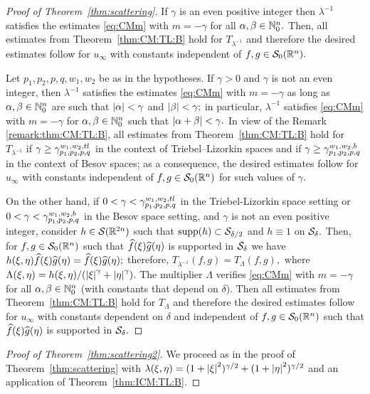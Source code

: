 \begin{proof}[Proof of Theorem~\ref{thm:scattering}]
If $\gamma$ is an even positive integer then $\lambda^{-1}$ satisfies the estimates \eqref{eq:CMm} with $m=-\gamma$ for all $\alpha,\beta\in\mathbb{N}_0^n.$ Then,  all estimates from Theorem~\ref{thm:CM:TL:B} hold for $T_{\lambda^{-1}}$  and therefore the desired estimates follow for $u_\infty$ with constants independent of $f,g\in{\mathcal{S}_0}({{\mathbb R}^n}).$ 

Let $p_1,p_2,p,q, w_1,w_2$ be as in the hypotheses.  If $\gamma>0$ and $\gamma$ is not an even integer, then $\lambda^{-1}$ satisfies the estimates \eqref{eq:CMm} with $m=-\gamma$ as long as  $\alpha,\beta\in\mathbb{N}_0^n$ are such that $\left\vert \alpha \right\vert<\gamma$ and $\left\vert \beta \right\vert<\gamma;$ in particular, $\lambda^{-1}$ satisfies \eqref{eq:CMm} with $m=-\gamma$ for $\alpha,\beta\in \mathbb{N}_0^n$ such that $\left\vert \alpha+\beta \right\vert<\gamma.$
In view of the Remark \ref{remark:thm:CM:TL:B}, all estimates from Theorem~\ref{thm:CM:TL:B} hold for $T_{\lambda^{-1}}$ if $\gamma\ge \gamma_{p_1,p_2,p,q}^{w_1,w_2, tl}$ in the context of Triebel--Lizorkin spaces and if $\gamma\ge \gamma_{p_1,p_2,p,q}^{w_1,w_2,b}$ in the context of Besov spaces; as a consequence, the desired estimates follow for $u_\infty$ with constants independent of $f,g\in{\mathcal{S}_0}({{\mathbb R}^n})$ for such values of $\gamma.$


On the other hand, if $0<\gamma<\gamma_{p_1,p_2,p,q}^{w_1,w_2, tl}$ in the Triebel-Lizorkin space setting or $0<\gamma<\gamma_{p_1,p_2,p,q}^{w_1,w_2,b}$ in the Besov space setting, and $\gamma$ is not an even positive integer, consider  $h\in\mathcal{S}(\mathbb{R}^{2n}) $ such that ${\rm{supp}}(h)\subset \mathcal{S}_{\delta/2}$ and $h\equiv 1$ on $\mathcal{S}_{\delta}.$ Then, for $f,g\in {\mathcal{S}_0}({{\mathbb R}^n})$ such that $\widehat{f}(\xi)\widehat{g}(\eta)$ is supported in $\mathcal{S}_{\delta}$ we have $h(\xi,\eta)\widehat{f}(\xi)\widehat{g}(\eta)=\widehat{f}(\xi)\widehat{g}(\eta);$   therefore, $T_{\lambda^{-1}}(f,g)=T_{\Lambda}(f,g),$ where
$\Lambda(\xi,\eta)=h(\xi,\eta)/(\left\vert \xi \right\vert^\gamma+\left\vert \eta \right\vert^\gamma).$ The multiplier $\Lambda$ verifies  \eqref{eq:CMm} with $m=-\gamma$  for all $\alpha,\beta\in\mathbb{N}_0^n$ (with constants that depend on $\delta$). Then all estimates from Theorem~\ref{thm:CM:TL:B} hold for $T_\Lambda$ and therefore the desired estimates follow for $u_\infty$ with constants dependent on $\delta$ and independent of $f,g\in{\mathcal{S}_0}({{\mathbb R}^n})$ such that  $\widehat{f}(\xi)\widehat{g}(\eta)$ is supported in $\mathcal{S}_{\delta}.$
\end{proof}

\begin{proof}[Proof of Theorem~\ref{thm:scattering2}] We proceed as in the proof of Theorem~\ref{thm:scattering} with $\lambda(\xi,\eta)=(1+\left\vert \xi \right\vert^2)^{\gamma /2}+(1+\left\vert \eta \right\vert^2)^{\gamma /2}$ and an application of  Theorem~\ref{thm:ICM:TL:B}.  
\end{proof}